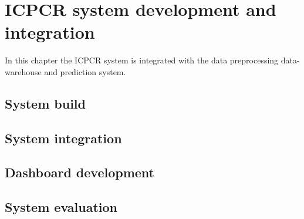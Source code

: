 \setlength{\footskip}{8mm}

\chapter{ICPCR system development and integration}
\label{ch:icpcr}

In this chapter the ICPCR system is integrated with the data preprocessing data-warehouse and prediction system.

\section{System build}

\section{System integration}

\section{Dashboard development}

\section{System evaluation}



